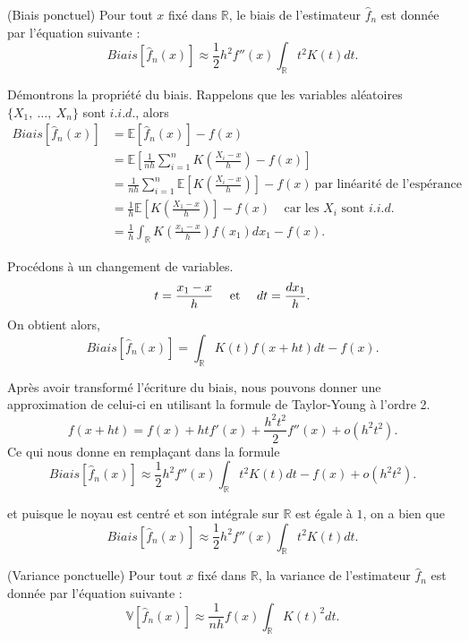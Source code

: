 \documentclass[
]{book}
\theoremstyle{definition}
\theoremstyle{definition}
\theoremstyle{definition}
\theoremstyle{definition}
\theoremstyle{remark}
\begin{document}
\begin{propri} (Biais ponctuel)
Pour tout $x$ fixé dans $\mathbb R$, le biais de l'estimateur $\hat f_n$ est donnée par l'équation suivante : 
$$Biais \left[ \hat f_n(x) \right] \approx \frac12h^2f''(x)\int_{\mathbb R} t^2K(t) dt.$$
\end{propri}

\begin{demo}
Démontrons la propriété du biais.
Rappelons que les variables aléatoires $\{ X_1,~\dots, ~X_n\}$ sont $i.i.d.$, alors
$$
\begin{aligned}
Biais  \left[ \hat f_n(x) \right] &= \mathbb E \left[ \hat f_n(x) \right] - f(x) \\
&= \mathbb E \left[ \frac1{nh} \sum\limits_{i=1}^n K\left(\frac{X_i-x}h\right) - f(x) \right] \\
&= \frac1{nh} \sum\limits_{i=1}^n \mathbb E \left[  K\left(\frac{X_i-x}h\right) \right] - f(x) ~\text{par linéarité de l'espérance} \\
&= \frac1{h} \mathbb E \left[  K\left(\frac{X_1-x}h\right) \right] - f(x) ~~~~~\text{car les } X_i \text{ sont }i.i.d.\\
&= \frac1{h} \int_{\mathbb R}  K\left(\frac{x_1-x}h\right) f(x_1)dx_1 - f(x).
\end{aligned}
$$

Procédons à un changement de variables.
$$t=\frac{x_1-x}h ~~~~\hbox{et}~~~~dt =\frac{dx_1}h.$$
On obtient alors, 
$$
Biais  \left[ \hat f_n(x) \right]
= \int_{\mathbb R}  K(t)  f(x+ht)dt - f(x).
$$

Après avoir transformé l'écriture du biais, nous pouvons donner une approximation de celui-ci en utilisant la formule de Taylor-Young à l'ordre 2.
$$f(x+ht)=f(x)+htf'(x)+\frac{h^2t^2}2 f''(x)+o(h^2t^2).$$
Ce qui nous donne en remplaçant dans la formule
$$
Biais \left[ \hat f_n(x) \right] \approx \frac12h^2f''(x)\int_{\mathbb R} t^2K(t) dt - f(x) + o(h^2t^2).
$$

et puisque le noyau est centré et son intégrale sur $\mathbb R$ est égale à $1$, on a bien que 
$$Biais \left[ \hat f_n(x) \right] \approx \frac12h^2f''(x)\int_{\mathbb R} t^2K(t) dt.$$

\end{demo}

\begin{propri} (Variance ponctuelle)
Pour tout $x$ fixé dans $\mathbb R$, la variance de l'estimateur $\hat f_n$ est donnée par l'équation suivante : 
$$\mathbb V \left[ \hat f_n(x) \right] \approx \frac1{nh} f(x) \int_{\mathbb R}K(t)^2 dt.$$
\end{propri}
\end{document}
